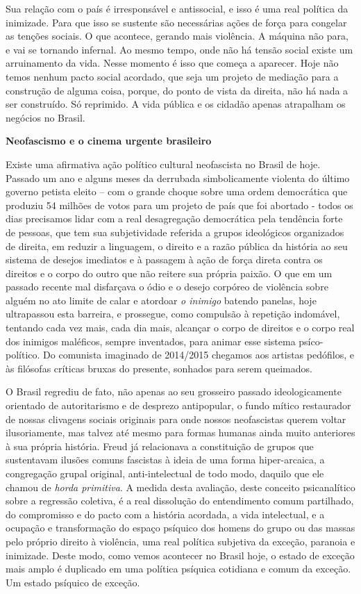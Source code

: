 Sua relação com o país é irresponsável e antissocial, e isso é uma real
política da inimizade. Para que isso se sustente são necessárias ações
de força para congelar as tenções sociais. O que acontece, gerando mais
violência. A máquina não para, e vai se tornando infernal. Ao mesmo
tempo, onde não há tensão social existe um arruinamento da vida. Nesse
momento é isso que começa a aparecer. Hoje não temos nenhum pacto social
acordado, que seja um projeto de mediação para a construção de alguma
coisa, porque, do ponto de vista da direita, não há nada a ser
construído. Só reprimido. A vida pública e os cidadão apenas atrapalham
os negócios no Brasil.

\textbf{Neofascismo e o cinema urgente brasileiro }

Existe uma afirmativa ação político cultural neofascista no Brasil de
hoje. Passado um ano e alguns meses da derrubada simbolicamente violenta
do último governo petista eleito -- com o grande choque sobre uma ordem
democrática que produziu 54 milhões de votos para um projeto de país que
foi abortado - todos os dias precisamos lidar com a real desagregação
democrática pela tendência forte de pessoas, que tem sua subjetividade
referida a grupos ideológicos organizados de direita, em reduzir a
linguagem, o direito e a razão pública da história ao seu sistema de
desejos imediatos e à passagem à ação de força direta contra os direitos
e o corpo do outro que não reitere sua própria paixão. O que em um
passado recente mal disfarçava o ódio e o desejo corpóreo de violência
sobre alguém no ato limite de calar e atordoar \emph{o inimigo} batendo
panelas, hoje ultrapassou esta barreira, e prossegue, como compulsão à
repetição indomável, tentando cada vez mais, cada dia mais, alcançar o
corpo de direitos e o corpo real dos inimigos maléficos, sempre
inventados, para animar esse sistema psíco-político. Do comunista
imaginado de 2014/2015 chegamos aos artistas pedófilos, e às filósofas
críticas bruxas do presente, sonhados para serem queimados.

O Brasil regrediu de fato, não apenas ao seu grosseiro passado
ideologicamente orientado de autoritarismo e de desprezo antipopular, o
fundo mítico restaurador de nossas clivagens sociais originais para onde
nossos neofascistas querem voltar ilusoriamente, mas talvez até mesmo
para formas humanas ainda muito anteriores à sua própria história. Freud
já relacionava a constituição de grupos que sustentavam ilusões comuns
fascistas à ideia de uma forma hiper-arcaica, a congregação grupal
original, anti-intelectual de todo modo, daquilo que ele chamou de
\emph{horda primitiva}. A medida desta avaliação, deste conceito
psicanalítico sobre a regressão coletiva, é a real dissolução do
entendimento comum partilhado, do compromisso e do pacto com a história
acordada, a vida intelectual, e a ocupação e transformação do espaço
psíquico dos homens do grupo ou das massas pelo próprio direito à
violência, uma real política subjetiva da exceção, paranoia e inimizade.
Deste modo, como vemos acontecer no Brasil hoje, o estado de exceção
mais amplo é duplicado em uma política psíquica cotidiana e comum da
exceção. Um estado psíquico de exceção.


